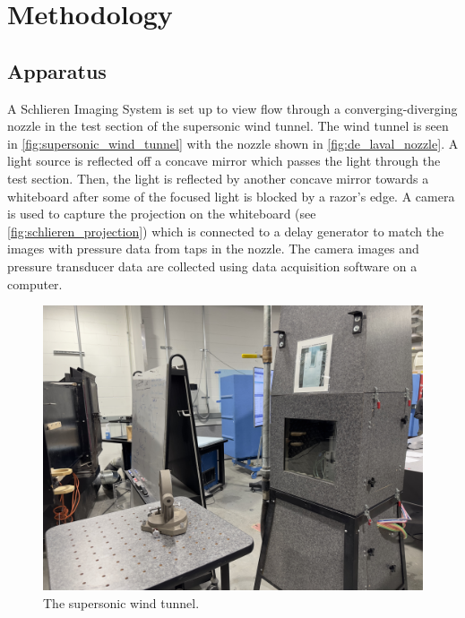\chapter{Methodology} \label{cp:methodology}

\section{Apparatus} \label{sec:apparatus}
A Schlieren Imaging System is set up to view flow through a converging-diverging nozzle in the test section of the supersonic wind tunnel. The wind tunnel is seen in \autoref{fig:supersonic_wind_tunnel} with the nozzle shown in \autoref{fig:de_laval_nozzle}. A light source is reflected off a concave mirror which passes the light through the test section. Then, the light is reflected by another concave mirror towards a whiteboard after some of the focused light is blocked by a razor's edge. A camera is used to capture the projection on the whiteboard (see \autoref{fig:schlieren_projection}) which is connected to a delay generator to match the images with pressure data from taps in the nozzle. The camera images and pressure transducer data are collected using data acquisition software on a computer. 

\begin{figure}[htpb]
    \centering
    \includegraphics[width=0.75\linewidth]{Figures/back_of_supersonic_wind_tunnel.jpeg}
    \caption{The supersonic wind tunnel.}
    \label{fig:supersonic_wind_tunnel}
\end{figure}


